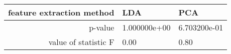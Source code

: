 \begin{tabular}{|r|l|l|}
  \hline
  feature extraction method & LDA & PCA \\
  \hline
  p-value & 1.000000e+00 & 6.703200e-01 \\
  \hline
  value of statistic F & 0.00 & 0.80 \\
  \hline
\end{tabular}

